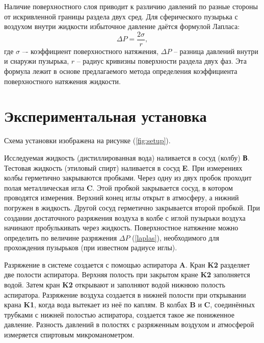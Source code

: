 \documentclass[a4paper,12pt]{article} %
\begin{document}
Наличие поверхностного слоя приводит к различию давлений по разные стороны от искривленной границы раздела двух сред. Для сферического пузырька с воздухом  внутри жидкости избыточное давление даётся формулой Лапласа:
	\begin{equation}
		\label{laplas}
		\Delta P = \frac{2\sigma}{r},
	\end{equation}
	где $\sigma$ –- коэффициент поверхностного натяжения, $\Delta P$ – разница давлений внутри и снаружи пузырька, $r$ – радиус кривизны поверхности раздела двух фаз. Эта формула лежит в основе предлагаемого метода определения коэффициента поверхностного натяжения жидкости.

\section*{Экспериментальная установка} 

Схема установки изображена на рисунке (\ref{fig:setup}). 

Исследуемая жидкость (дистиллированная вода) наливается в сосуд (колбу) \textbf{В}. Тестовая жидкость  (этиловый спирт) наливается  в сосуд \textbf{E}. При измерениях  колбы герметично закрываются  пробками.   Через одну из двух пробок  проходит полая металлическая игла \textbf{C}. Этой пробкой закрывается сосуд, в котором  проводятся измерения. Верхний конец иглы открыт в атмосферу, а нижний погружен в жидкость. Другой сосуд герметично закрывается второй пробкой. При создании достаточного  разряжения воздуха в колбе с иглой пузырьки воздуха начинают пробулькивать через жидкость. Поверхностное натяжение можно определить по величине разряжения $\Delta P$ (\ref{laplas}), необходимого для прохождения пузырьков (при известном радиусе иглы).
	
Разряжение в системе создается с помощью аспиратора \textbf{A}. Кран \textbf{K2} разделяет две полости аспиратора. Верхняя полость при закрытом кране \textbf{K2}  заполняется водой. Затем кран \textbf{K2} открывают и заполняют водой  нижнюю полость  аспиратора.  Разряжение воздуха создается в нижней полости  при открывании крана \textbf{K1}, когда  вода вытекает из неё по каплям. В колбах \textbf{B} и \textbf{C}, соединённых трубками с нижней полостью аспиратора,  создается такое же пониженное давление. Разность давлений в полостях с разряженным воздухом и атмосферой измеряется спиртовым микроманометром.
\end{document}
